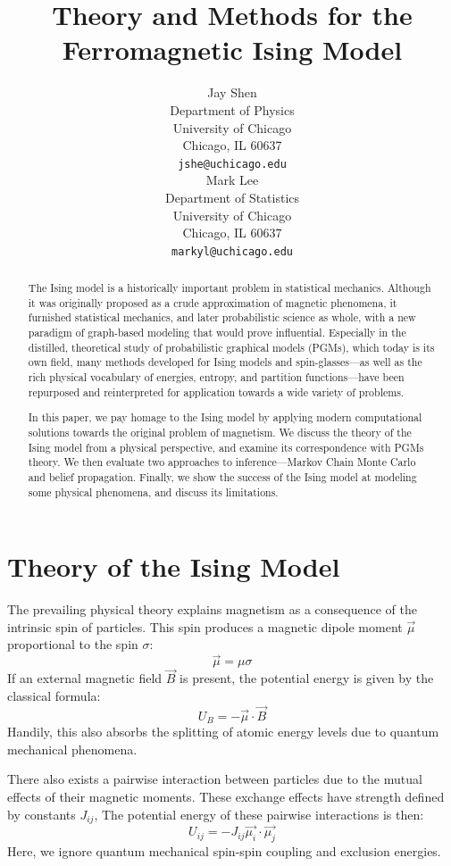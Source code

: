 \documentclass{article}
\title{Theory and Methods for the Ferromagnetic Ising Model}
\author{
    Jay Shen \\
    Department of Physics \\
    University of Chicago\\
    Chicago, IL 60637 \\
    \texttt{jshe@uchicago.edu} \\
    \And
    Mark Lee \\
    Department of Statistics \\
    University of Chicago\\
    Chicago, IL 60637 \\
    \texttt{markyl@uchicago.edu} \\
}
\begin{document}
\graphicspath{ {../graphics} }

\maketitle

\begin{abstract}

The Ising model is a historically important problem in statistical mechanics. 
Although it was originally proposed as a crude approximation of magnetic 
phenomena, it furnished statistical mechanics, and later probabilistic science 
as whole, with a new paradigm of graph-based modeling that would prove 
influential.
Especially in the distilled, theoretical study of probabilistic graphical 
models (PGMs), which today is its own field, many methods developed for Ising 
models and spin-glasses—as well as the rich physical vocabulary of energies, 
entropy, and partition functions—have been repurposed and reinterpreted for 
application towards a wide variety of problems. 

In this paper, we pay homage to the Ising model by applying modern computational 
solutions towards the original problem of magnetism. 
We discuss the theory of the Ising model from a physical perspective, and 
examine its correspondence with PGMs theory. 
We then evaluate two approaches to inference—Markov Chain Monte Carlo and
belief propagation. 
Finally, we show the success of the Ising model at modeling some physical 
phenomena, and discuss its limitations. 
%
%
%
%
%
\end{abstract}
%
%
%
%
%
\section{Theory of the Ising Model}

The prevailing physical theory explains magnetism as a consequence of the intrinsic 
spin of particles. 
This spin produces a magnetic dipole moment $\vec{\mu}$ proportional to the 
spin $\sigma$:
\[\vec{\mu} = \mu \sigma\]
If an external magnetic field $\vec{B}$ is present, the potential energy is 
given by the classical formula:
\[U_B = - \vec{\mu} \cdot \vec{B}\]
Handily, this also absorbs the splitting of atomic energy levels due to quantum 
mechanical phenomena. 

There also exists a pairwise interaction between particles due to the mutual 
effects of their magnetic moments.
These exchange effects have strength defined by constants $J_{ij}$, 
The potential energy of these pairwise interactions is then:
\[U_{ij} = - J_{ij} \vec{\mu_i} \cdot \vec{\mu_j}\]
Here, we ignore quantum mechanical spin-spin coupling and exclusion energies. 
\end{document}
